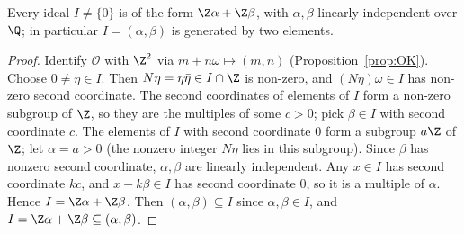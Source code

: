 \begin{lemma}\label{lem:twogen}
Every ideal $I\ne\{0\}$ is of the form $\Z\alpha+\Z\beta$, with $\alpha,\beta$ linearly independent over $\Q$; in particular $I=(\alpha,\beta)$ is generated by two elements.
\end{lemma}
\begin{proof}
Identify $\mathcal O$ with $\Z^2$ via $m+n\omega\mapsto(m,n)$ (Proposition~\ref{prop:OK}). Choose $0\ne\eta\in I$. Then $N\eta=\eta\bar\eta\in I\cap\Z$ is non-zero, and $(N\eta)\omega\in I$ has non-zero second coordinate. The second coordinates of elements of $I$ form a non-zero subgroup of $\Z$, so they are the multiples of some $c>0$; pick $\beta\in I$ with second coordinate $c$. The elements of $I$ with second coordinate $0$ form a subgroup $a\Z$ of $\Z$; let $\alpha=a>0$ (the nonzero integer $N\eta$ lies in this subgroup). Since $\beta$ has nonzero second coordinate, $\alpha,\beta$ are linearly independent. Any $x\in I$ has second coordinate $kc$, and $x-k\beta\in I$ has second coordinate $0$, so it is a multiple of $\alpha$. Hence $I=\Z\alpha+\Z\beta$. Then $(\alpha,\beta)\subseteq I$ since $\alpha,\beta\in I$, and $I=\Z\alpha+\Z\beta\subseteq(\alpha,\beta)$.
\end{proof}

